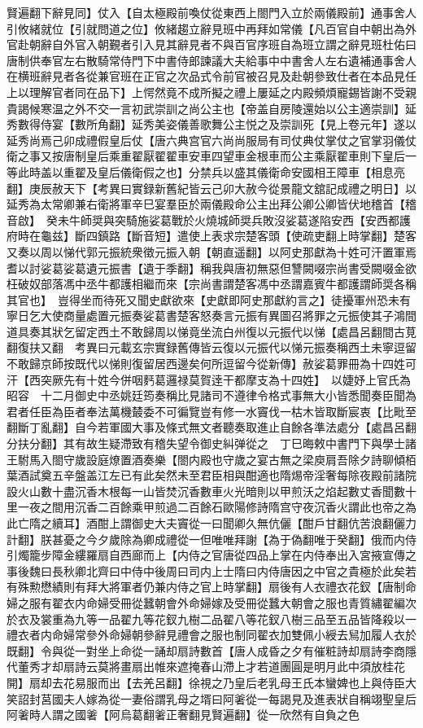 賢遍翻下辭見同】仗入【自太極殿前喚仗從東西上閤門入立於兩儀殿前】通事舍人引攸緒就位【引就問道之位】攸緒趨立辭見班中再拜如常儀【凡百官自中朝出為外官赴朝辭自外官入朝覲者引入見其辭見者不與百官序班自為班立謂之辭見班杜佑曰唐制供奉官左右散騎常侍門下中書侍郎諫議大夫給事中中書舍人左右遺補通事舍人在横班辭見者各從兼官班在正官之次品式令前官被召見及赴朝參致仕者在本品見任上以理解官者同在品下】上愕然竟不成所擬之禮上屢延之内殿頻煩寵錫皆謝不受親貴謁候寒温之外不交一言初武崇訓之尚公主也【帝盖自房陵還始以公主適崇訓】延秀數得侍宴【數所角翻】延秀美姿儀善歌舞公主悦之及崇訓死【見上卷元年】遂以延秀尚焉己卯成禮假皇后仗【唐六典宫官六尚尚服局有司仗典仗掌仗之官掌羽儀仗衛之事又按唐制皇后乘重翟厭翟翟車安車四望車金根車而公主乘厭翟車則下皇后一等此時盖以重翟及皇后儀衛假之也】分禁兵以盛其儀衛命安國相王障車【相息亮翻】庚辰赦天下【考異曰實録新舊紀皆云己卯大赦今從景龍文舘記成禮之明日】以延秀為太常卿兼右衛將軍辛巳宴羣臣於兩儀殿命公主出拜公卿公卿皆伏地稽首【稽音啟】　癸未牛師奨與突騎施娑葛戰於火燒城師奨兵敗沒娑葛遂陷安西【安西都護府時在龜兹】斷四鎮路【斷音短】遣使上表求宗楚客頭【使疏吏翻上時掌翻】楚客又奏以周以悌代郭元振統衆徵元振入朝【朝直遥翻】以阿史那獻為十姓可汗置軍焉耆以討娑葛娑葛遺元振書【遺于季翻】稱我與唐初無惡但讐闕啜宗尚書受闕啜金欲枉破奴部落馮中丞牛都護相繼而來【宗尚書謂楚客馮中丞謂嘉賓牛都護謂師奨各稱其官也】　豈得坐而待死又聞史獻欲來【史獻即阿史那獻約言之】徒擾軍州恐未有寧日乞大使商量處置元振奏娑葛書楚客怒奏言元振有異圖召將罪之元振使其子鴻間道具奏其狀乞留定西土不敢歸周以悌竟坐流白州復以元振代以悌【處昌呂翻間古莧翻復扶又翻　考異曰元載玄宗實録舊傳皆云復以元振代以悌元振奏稱西土未寧逗留不敢歸京師按既代以悌則復留居西邊矣何所逗留今從新傳】赦娑葛罪冊為十四姓可汗【西突厥先有十姓今併咽麫葛邏禄莫賀逹干都摩支為十四姓】　以婕妤上官氏為昭容　十二月御史中丞姚廷筠奏稱比見諸司不遵律令格式事無大小皆悉聞奏臣聞為君者任臣為臣者奉法萬機樷委不可徧覽豈有修一水竇伐一枯木皆取斷宸衷【比毗至翻斷丁亂翻】自今若軍國大事及條式無文者聽奏取進止自餘各準法處分【處昌呂翻分扶分翻】其有故生疑滯致有稽失望令御史糾弹從之　丁巳晦敕中書門下與學士諸王駙馬入閤守歲設庭燎置酒奏樂【閤内殿也守歲之宴古無之梁庾肩吾除夕詩聊傾栢葉酒試奠五辛盤盖江左已有此矣然未至君臣相與酣適也隋焬帝淫奢每除夜殿前諸院設火山數十盡沉香木根每一山皆焚沉香數車火光暗則以甲煎沃之焰起數丈香聞數十里一夜之間用沉香二百餘乘甲煎過二百餘石歐陽修詩隋宫守夜沉香火謂此也帝之為此亡隋之續耳】酒酣上謂御史大夫竇從一曰聞卿久無伉儷【酣戶甘翻伉苦浪翻儷力計翻】朕甚憂之今夕歲除為卿成禮從一但唯唯拜謝【為于偽翻唯于癸翻】俄而内侍引燭籠步障金縷羅扇自西廊而上【内侍之官唐從四品上掌在内侍奉出入宮掖宣傳之事後魏曰長秋卿北齊曰中侍中後周曰司内上士隋曰内侍唐因之中官之貴極於此矣若有殊勲懋績則有拜大將軍者仍兼内侍之官上時掌翻】扇後有人衣禮衣花釵【唐制命婦之服有翟衣内命婦受冊從蠶朝會外命婦嫁及受冊從蠶大朝會之服也青質繡翟編次於衣及裳重為九等一品翟九等花釵九樹二品翟八等花釵八樹三品至五品皆降殺以一禮衣者内命婦常參外命婦朝參辭見禮會之服也制同翟衣加雙佩小綬去舃加履人衣於既翻】令與從一對坐上命從一誦却扇詩數首【唐人成昏之夕有催粧詩却扇詩李商隱代董秀才却扇詩云莫將畫扇出帷來遮掩春山滯上才若道團圓是明月此中須放桂花開】扇却去花易服而出【去羌呂翻】徐視之乃皇后老乳母王氏本蠻婢也上與侍臣大笑詔封莒國夫人嫁為從一妻俗謂乳母之壻曰阿㸙從一每謁見及進表狀自稱翊聖皇后阿㸙時人謂之國㸙【阿烏葛翻㸙正奢翻見賢遍翻】從一欣然有自負之色

